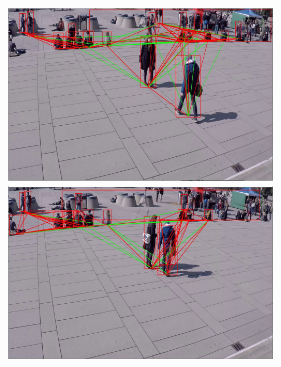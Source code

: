 \documentclass[12pt]{report}
\begin{document}
\includegraphics[width=70mm]{./images/appendix/Cam7Clip1BoundingBoxTest3.JPG}
\includegraphics[width=70mm]{./images/appendix/Cam7Clip1BoundingBoxTest5.JPG}
\end{document}
